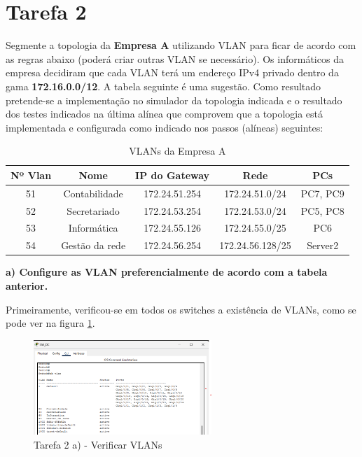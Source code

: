 \documentclass[11pt,english, openright, oneside]{book}
\begin{document}
\pagebreak



\section{Tarefa 2}
\vspace{0.2cm}

Segmente a topologia da \textbf{Empresa A} utilizando VLAN para ficar de acordo
com as regras abaixo (poderá criar outras VLAN se necessário). Os informáticos
da empresa decidiram que cada VLAN terá um endereço IPv4 privado dentro da gama
\textbf{172.16.0.0/12}. A tabela seguinte é uma sugestão. Como resultado
pretende-se a implementação no  simulador da topologia indicada e o resultado
dos testes indicados na última alínea que comprovem que a topologia está
implementada e configurada como indicado nos passos (alíneas) seguintes:  

\begin{table}[h!]
\centering
\begin{tabular}{|c|c|c|c|c|}
\hline
\textbf{Nº Vlan} & \textbf{Nome} & \textbf{IP do Gateway} & \textbf{Rede} &
\textbf{PCs}\\
\hline
51 & Contabilidade & 172.24.51.254 & 172.24.51.0/24 & PC7, PC9\\
52 & Secretariado & 172.24.53.254 & 172.24.53.0/24 & PC5, PC8\\
53 & Informática & 172.24.55.126 & 172.24.55.0/25 & PC6\\
54 & Gestão da rede & 172.24.56.254 & 172.24.56.128/25 & Server2\\
\hline
\end{tabular}
\caption{VLANs da Empresa A}
\label{tab:vlansA}
\end{table}
\vspace{0.8cm}

\textbf{a) Configure as VLAN preferencialmente de acordo com a tabela anterior.}
\vspace{0.2cm}

Primeiramente, verificou-se em todos os switches a existência de VLANs, como se
pode ver na figura \ref{fig:2a1}. 

\begin{figure}[H]
    \centering
    \includegraphics[width=0.6\textwidth]{imagens/Tarefa2/2.a.1.png}
    \caption{Tarefa 2 a) - Verificar VLANs}
    \label{fig:2a1}
\end{figure}
\end{document}
